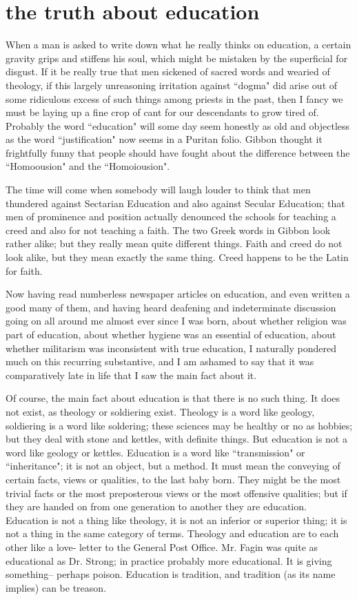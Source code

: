 \documentclass[final,10pt,letterpaper,twocolumn,openany]{book}
\begin{document}
\section{the truth about education}

    When a man is asked to write down what he really thinks on education,
a certain gravity grips and stiffens his soul, which might be mistaken by
the superficial for disgust. If it be really true that men sickened of sacred
words and wearied of theology, if this largely unreasoning irritation
against ``dogma" did arise out of some ridiculous excess of such things
among priests in the past, then I fancy we must be laying up a fine crop of
cant for our descendants to grow tired of. Probably the word ``education"
will some day seem honestly as old and objectless as the word
``justification" now seems in a Puritan folio. Gibbon thought it frightfully
funny that people should have fought about the difference between the
``Homoousion" and the ``Homoiousion". 

The time will come when
somebody will laugh louder to think that men thundered against Sectarian
Education and also against Secular Education; that men of prominence and
position actually denounced the schools for teaching a creed and also for
not teaching a faith. The two Greek words in Gibbon look rather alike; but
they really mean quite different things. Faith and creed do not look alike,
but they mean exactly the same thing. Creed happens to be the Latin for
faith.

Now having read numberless newspaper articles on education, and
even written a good many of them, and having heard deafening and
indeterminate discussion going on all around me almost ever since I was
born, about whether religion was part of education, about whether hygiene
was an essential of education, about whether militarism was inconsistent
with true education, I naturally pondered much on this recurring
substantive, and I am ashamed to say that it was comparatively late in life
that I saw the main fact about it.

Of course, the main fact about education is that there is no such thing.
It does not exist, as theology or soldiering exist. Theology is a word like
geology, soldiering is a word like soldering; these sciences may be healthy
or no as hobbies; but they deal with stone and kettles, with definite things.
But education is not a word like geology or kettles. Education is a word
like ``transmission" or ``inheritance"; it is not an object, but a method. It
must mean the conveying of certain facts, views or qualities, to the last
baby born. They might be the most trivial facts or the most preposterous
views or the most offensive qualities; but if they are handed on from one
generation to another they are education. Education is not a thing like
theology, it is not an inferior or superior thing; it is not a thing in the same
category of terms. Theology and education are to each other like a love-
letter to the General Post Office. Mr. Fagin was quite as educational as Dr.
Strong; in practice probably more educational. It is giving something--
perhaps poison. Education is tradition, and tradition (as its name implies)
can be treason.
\end{document}
